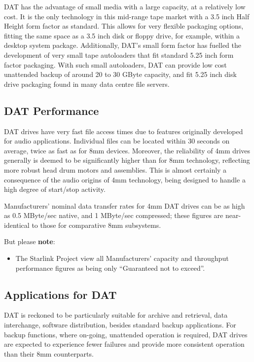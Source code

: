 DAT has the advantage of small media with a large capacity, at a relatively
low cost. It is the only technology in this mid-range tape market with a 3.5
inch Half Height form factor as standard. This allows for very flexible
packaging options, fitting the same space as a 3.5 inch disk or floppy drive,
for example, within a desktop system package. Additionally, DAT's small form
factor has fuelled the development of very small tape autoloaders that fit
standard 5.25 inch form factor packaging. With such small autoloaders, DAT
can provide low cost unattended backup of around 20 to 30 GByte capacity, and
fit 5.25 inch disk drive packaging found in many data centre file servers.

\subsection {DAT Performance}

DAT drives have very fast file access times due to features originally
developed for audio applications. Individual files can be located within
30 seconds on average, twice as fast as for 8mm devices. Moreover, the
reliability of 4mm drives generally is deemed to be significantly higher
than for 8mm technology, reflecting more robust head drum motors and
assemblies. This is almost certainly a consequence of the audio origins of
4mm technology, being designed to handle a high degree of start/stop
activity.

Manufacturers' nominal data transfer rates for 4mm DAT drives can be as high
as 0.5 MByte/sec native, and 1 MByte/sec compressed; these figures are
near-identical to those for comparative 8mm subsystems.

But please {\bf note}:
\begin {itemize}

\item[{\LARGE\bf $\star$}] The Starlink Project view all Manufacturers' capacity
and throughput performance figures as being only ``Guaranteed not to exceed''.

\end {itemize}
\subsection {Applications for DAT}

DAT is reckoned to be particularly suitable for archive and retrieval, data
interchange, software distribution, besides standard backup applications.
For backup functions, where on-going, unattended operation is required, DAT
drives are expected to experience fewer failures and provide more consistent
operation than their 8mm counterparts.

